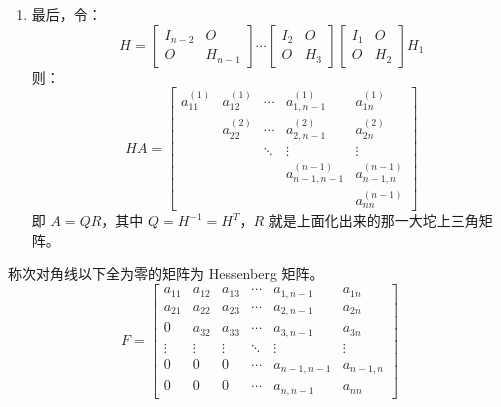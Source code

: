 \begin{enumerate}
    \item 最后，令：
    \[
        H=\begin{bmatrix}I_{n-2}&O\\O&H_{n-1}\end{bmatrix}\cdots\begin{bmatrix}I_{2}&O\\O&H_{3}\end{bmatrix}\begin{bmatrix}I_{1}&O\\O&H_{2}\end{bmatrix}H_1
    \]
    则：
    \[
        HA=\begin{bmatrix}
        a_{11}^{(1)}&a_{12}^{(1)}&\cdots&a_{1,n-1}^{(1)}&a_{1n}^{(1)}\\
        &a_{22}^{(2)}&\cdots&a_{2,n-1}^{(2)}&a_{2n}^{(2)}\\
        &&\ddots&\vdots&\vdots\\
        &&&a_{n-1,n-1}^{(n-1)}&a_{n-1,n}^{(n-1)}\\
        &&&&a_{nn}^{(n-1)}
        \end{bmatrix}
    \]
    即 $A=QR$，其中 $Q=H^{-1}=H^T$，$R$ 就是上面化出来的那一大坨上三角矩阵。
\end{enumerate}


\begin{definition}[Hessenberg 矩阵]
称次对角线以下全为零的矩阵为 Hessenberg 矩阵。
\[
    F=\begin{bmatrix}
    a_{11}&a_{12}&a_{13}&\cdots&a_{1,n-1}&a_{1n}\\
    a_{21}&a_{22}&a_{23}&\cdots&a_{2,n-1}&a_{2n}\\
    0&a_{32}&a_{33}&\cdots&a_{3,n-1}&a_{3n}\\
    \vdots&\vdots&\vdots&\ddots&\vdots&\vdots\\
    0&0&0&\cdots&a_{n-1,n-1}&a_{n-1,n}\\
    0&0&0&\cdots&a_{n,n-1}&a_{nn}
    \end{bmatrix}
\]
\end{definition}

